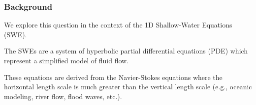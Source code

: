 \begin{frame}
    \frametitle{Background}

    We explore this question in the context of the 1D Shallow-Water Equations (SWE).
    \bigskip

    \pause 
    The SWEs are a system of hyperbolic partial differential equations (PDE) which represent a simplified model of fluid
    flow.

    \bigskip
    \pause
    These equations are derived from the Navier-Stokes equations where the horizontal length scale is
    much greater than the vertical length scale (e.g., oceanic modeling, river flow, flood waves, etc.).
\end{frame}